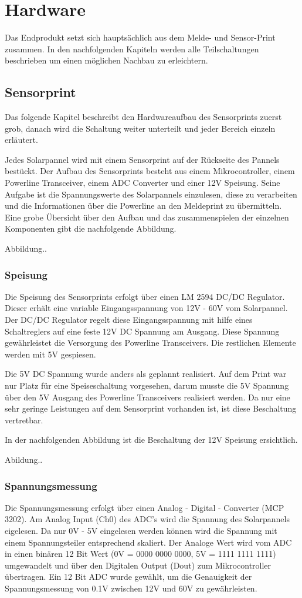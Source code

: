 \section{Hardware}
Das Endprodukt setzt sich hauptsächlich aus dem Melde- und Sensor-Print zusammen. In den nachfolgenden Kapiteln werden alle Teilschaltungen beschrieben um einen möglichen Nachbau zu erleichtern.
\subsection{Sensorprint}
Das folgende Kapitel beschreibt den Hardwareaufbau des Sensorprints zuerst grob, danach wird die Schaltung weiter unterteilt und jeder Bereich einzeln erläutert.

Jedes Solarpannel wird mit einem Sensorprint auf der Rückseite des Pannels bestückt. Der Aufbau des Sensorprints besteht aus einem Mikrocontroller, einem Powerline Transceiver, einem ADC Converter und einer 12V Speisung. Seine Aufgabe ist die Spannungswerte des Solarpannels einzulesen, diese zu verarbeiten und die Informationen über die Powerline an den Meldeprint zu übermitteln. Eine grobe Übersicht über den Aufbau und das zusammenspielen der einzelnen Komponenten gibt die nachfolgende Abbildung.

Abbildung..


\subsubsection{Speisung}
Die Speisung des Sensorprints erfolgt über einen LM 2594 DC/DC Regulator. Dieser erhält eine variable Eingangsspannung von 12V - 60V vom Solarpannel. Der DC/DC Regulator regelt diese Eingangsspannung mit hilfe eines Schaltreglers auf eine feste 12V DC Spannung am Ausgang. Diese Spannung gewährleistet die Versorgung des Powerline Transceivers. Die restlichen Elemente werden mit 5V gespiesen.

Die 5V DC Spannung wurde anders als geplannt realisiert. Auf dem Print war nur Platz für eine Speiseschaltung vorgesehen, darum musste die 5V Spannung über den 5V Ausgang des Powerline Transceivers realisiert werden. Da nur eine sehr geringe Leistungen auf dem Sensorprint vorhanden ist, ist diese Beschaltung vertretbar.

In der nachfolgenden Abbildung ist die Beschaltung der 12V Speisung ersichtlich.

Abildung..

\subsubsection{Spannungsmessung}
Die Spannungsmessung erfolgt über einen Analog - Digital - Converter (MCP 3202). Am Analog Input (Ch0) des ADC's wird die Spannung des Solarpannels eigelesen. Da nur 0V - 5V eingelesen werden können wird die Spannung mit einem Spannungsteiler entsprechend skaliert. Der Analoge Wert wird vom ADC in einen binären 12 Bit Wert (0V = 0000 0000 0000, 5V = 1111 1111 1111) umgewandelt und über den Digitalen Output (Dout) zum Mikrocontroller übertragen. Ein 12 Bit ADC wurde gewählt, um die Genauigkeit der Spannungsmessung von 0.1V zwischen 12V und 60V zu gewährleisten.

